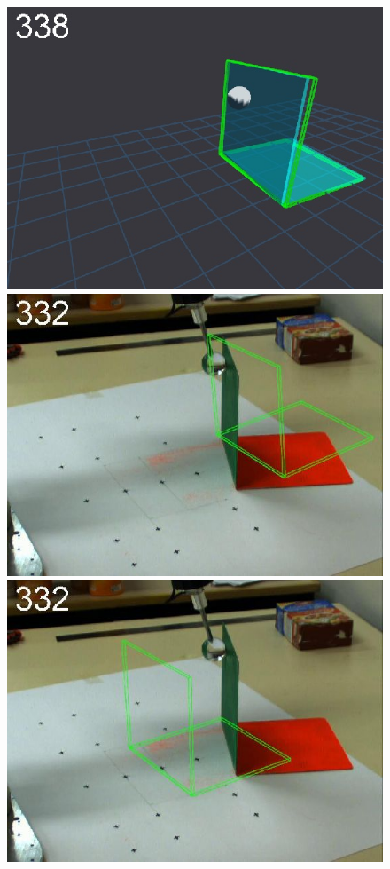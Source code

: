 \begin{figure}[tb]
{\includegraphics[width=\imgBXwid]{./B1_3exp_20_5}
\includegraphics[width=\imgBXwid]{./B2_2exp_58_5}
\includegraphics[width=\imgBXwid]{./B2_1exp_58_5}
}
\end{figure}
